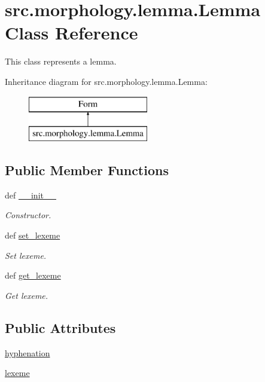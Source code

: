 \hypertarget{classsrc_1_1morphology_1_1lemma_1_1_lemma}{\section{src.\+morphology.\+lemma.\+Lemma Class Reference}
\label{classsrc_1_1morphology_1_1lemma_1_1_lemma}
}


This class represents a lemma.  


Inheritance diagram for src.\+morphology.\+lemma.\+Lemma\+:\begin{figure}[H]
\begin{center}
\leavevmode
\includegraphics[height=2.000000cm]{classsrc_1_1morphology_1_1lemma_1_1_lemma}
\end{center}
\end{figure}
\subsection*{Public Member Functions}
\begin{DoxyCompactItemize}
\item 
def \hyperlink{classsrc_1_1morphology_1_1lemma_1_1_lemma_ab3860c335c5f4f9a1f05503aea52432a}{\+\_\+\+\_\+init\+\_\+\+\_\+}
\begin{DoxyCompactList}\small\item\em Constructor. \end{DoxyCompactList}\item 
def \hyperlink{classsrc_1_1morphology_1_1lemma_1_1_lemma_aa67436a851e3c33061bcce5834715be8}{set\+\_\+lexeme}
\begin{DoxyCompactList}\small\item\em Set lexeme. \end{DoxyCompactList}\item 
def \hyperlink{classsrc_1_1morphology_1_1lemma_1_1_lemma_a8b587cf5fa331a41d3ad969085b628c3}{get\+\_\+lexeme}
\begin{DoxyCompactList}\small\item\em Get lexeme. \end{DoxyCompactList}\end{DoxyCompactItemize}
\subsection*{Public Attributes}
\begin{DoxyCompactItemize}
\item 
\hyperlink{classsrc_1_1morphology_1_1lemma_1_1_lemma_a348c056c8be44e7e9b3e9c55e9973154}{hyphenation}
\item 
\hyperlink{classsrc_1_1morphology_1_1lemma_1_1_lemma_a7748c9b434cf254c617934fe550138bb}{lexeme}
\end{DoxyCompactItemize}


